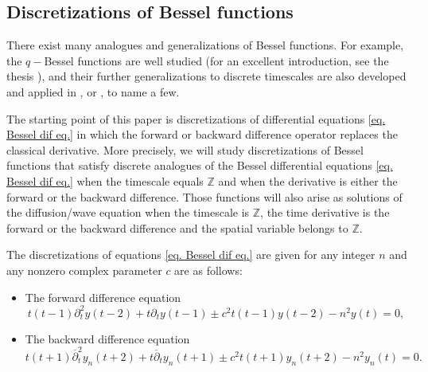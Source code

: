 \documentclass[12pt]{amsart}
\numberwithin{equation}{section}
\begin{document}


\subsection{Discretizations of Bessel functions}

There exist many analogues and generalizations of Bessel functions. For
example, the $q-$Bessel functions are well studied (for an excellent introduction, see the thesis \cite{Sw92}), and their further generalizations to discrete timescales are also developed and applied in \cite{Ma13}, \cite{RKN19} or \cite{YYT22}, to name a few.

The starting point of this paper is discretizations of differential equations \eqref{eq. Bessel dif eq.} in which the forward or backward difference operator replaces the classical derivative. More precisely, we will study discretizations of Bessel functions that satisfy discrete analogues of the Bessel differential equations
\eqref{eq.
Bessel dif eq.} when the timescale equals $\mathbb{Z}$ and when the
derivative is either the forward or the backward difference. Those functions
will also arise as solutions of the diffusion/wave equation when the
timescale is $\mathbb{Z}$, the time derivative is the forward or the backward
difference and the spatial variable belongs to $\mathbb{Z}$.

The discretizations of equations \eqref{eq. Bessel dif eq.} are given for any integer $n$ and any nonzero
complex parameter $c$ are as follows:
\begin{itemize}
\item The forward difference equation
\begin{equation}
t\left( t-1\right) \partial _{t}^{2}y\left( t-2\right) +t\partial
_{t}y\left( t-1\right) \pm c^{2}t\left( t-1\right) y\left( t-2\right)
-n^{2}y\left( t\right) =0,  \label{modBesselEq}
\end{equation}
\item The backward difference equation
\begin{equation}
t\left( t+1\right) \overline{\partial }_{t}^{2}y_{n}\left( t+2\right) +t%
\overline{\partial }_{t}y_{n}\left( t+1\right) \pm c^{2}t\left( t+1\right)
y_{n}\left( t+2\right) -n^{2}y_{n}\left( t\right) =0.  \label{backBesselEq1}
\end{equation}
\end{itemize}
\end{document}
